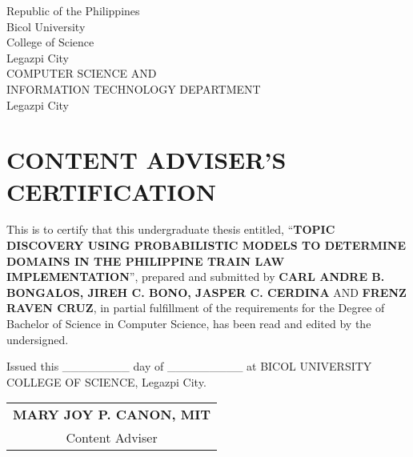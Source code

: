 %

\begin{center}
	{   Republic of the Philippines \\
		Bicol University \\
		College of Science \\
		Legazpi City \\
		COMPUTER SCIENCE AND\\
		INFORMATION TECHNOLOGY DEPARTMENT\\
		Legazpi City\\[0.1ex]}
\end{center} 

		
\section{\normalsize{CONTENT ADVISER'S CERTIFICATION}}
	
		This is to certify that this undergraduate thesis entitled, “\textbf{TOPIC DISCOVERY USING PROBABILISTIC MODELS TO DETERMINE DOMAINS IN THE PHILIPPINE TRAIN LAW IMPLEMENTATION}”, prepared and submitted by \textbf{CARL ANDRE B. BONGALOS, JIREH C. BONO, JASPER C. CERDINA} AND \textbf{FRENZ RAVEN CRUZ}, in partial fulfillment of the requirements for the Degree of Bachelor of Science in Computer Science, has been read and edited by the undersigned.
		 
		 
		Issued this \_\_\_\_\_\_\_\_ day of \_\_\_\_\_\_\_\_\_ at BICOL UNIVERSITY COLLEGE OF SCIENCE, Legazpi City.\\[80pt]

	
	\begin{flushright}
    \begin{tabular}{c}
    	\textbf{MARY JOY P. CANON, MIT}\\
        Content Adviser
    \end{tabular}
\end{flushright}
	
    

%